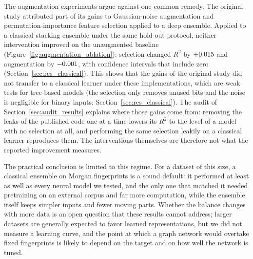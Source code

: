 The augmentation experiments argue against one common remedy. The original study attributed part of its gains to Gaussian-noise augmentation and permutation-importance feature selection applied to a deep ensemble. Applied to a classical stacking ensemble under the same hold-out protocol, neither intervention improved on the unaugmented baseline (Figure~\ref{fig:augmentation_ablation}): selection changed $R^2$ by $+0.015$ and augmentation by $-0.001$, with confidence intervals that include zero (Section~\ref{sec:res_classical}). This shows that the gains of the original study did not transfer to a classical learner under these implementations, which are weak tests for tree-based models (the selection only removes unused bits and the noise is negligible for binary inputs; Section~\ref{sec:res_classical}). The audit of Section~\ref{sec:audit_results} explains where those gains come from: removing the leaks of the published code one at a time lowers its $R^2$ to the level of a model with no selection at all, and performing the same selection leakily on a classical learner reproduces them. The interventions themselves are therefore not what the reported improvement measures.

The practical conclusion is limited to this regime. For a dataset of this size, a classical ensemble on Morgan fingerprints is a sound default: it performed at least as well as every neural model we tested, and the only one that matched it needed pretraining on an external corpus and far more computation, while the ensemble itself keeps simpler inputs and fewer moving parts. Whether the balance changes with more data is an open question that these results cannot address; larger datasets are generally expected to favor learned representations, but we did not measure a learning curve, and the point at which a graph network would overtake fixed fingerprints is likely to depend on the target and on how well the network is tuned.

